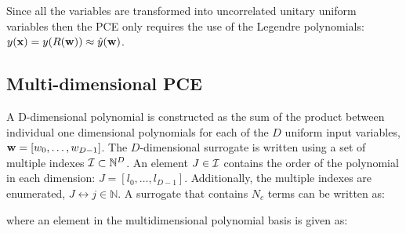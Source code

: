 \documentclass[preprint,12pt]{elsarticle}
\begin{document}

Since all the variables are transformed into uncorrelated unitary uniform variables then the PCE only requires the use of the Legendre polynomials: $y(\mathbf{x}) = y(R(\mathbf{w})) \approx \hat{y}(\mathbf{w})$. 





\subsection{Multi-dimensional PCE}

A D-dimensional polynomial is constructed as the sum of the product between individual one dimensional polynomials for each of the $D$ uniform input variables, $\mathbf{w}=[w_0,\dots,w_{D-1}]$. The $D$-dimensional surrogate is written using a set of multiple indexes $\mathcal{I} \subset \mathbb{N}^D$. An element $J\in \mathcal{I}$ contains the order of the polynomial in each dimension: $J = [l_0, \dots, l_{D-1}]$. Additionally, the multiple indexes are enumerated, $J \leftrightarrow j \in \mathbb{N}$. A surrogate that contains $N_c$ terms can be written as:


\noindent where an element in the multidimensional polynomial basis is given as:


\end{document}
